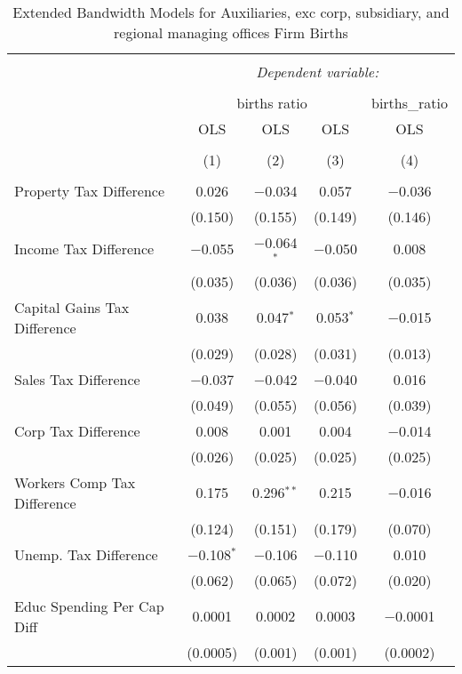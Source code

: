 
\begin{table}[!htbp] \centering 
  \caption{Extended Bandwidth Models for  Auxiliaries, exc corp, subsidiary, and regional managing offices Firm Births} 
  \label{95eb} 
\begin{tabular}{@{\extracolsep{5pt}}lcccc} 
\\[-1.8ex]\hline 
\hline \\[-1.8ex] 
 & \multicolumn{4}{c}{\textit{Dependent variable:}} \\ 
\cline{2-5} 
\\[-1.8ex] & \multicolumn{3}{c}{births ratio} & births\_ratio \\ 
 & OLS & OLS & OLS & OLS \\ 
\\[-1.8ex] & (1) & (2) & (3) & (4)\\ 
\hline \\[-1.8ex] 
 Property Tax Difference & 0.026 & $-$0.034 & 0.057 & $-$0.036 \\ 
  & (0.150) & (0.155) & (0.149) & (0.146) \\ 
  Income Tax Difference & $-$0.055 & $-$0.064$^{*}$ & $-$0.050 & 0.008 \\ 
  & (0.035) & (0.036) & (0.036) & (0.035) \\ 
  Capital Gains Tax Difference & 0.038 & 0.047$^{*}$ & 0.053$^{*}$ & $-$0.015 \\ 
  & (0.029) & (0.028) & (0.031) & (0.013) \\ 
  Sales Tax Difference & $-$0.037 & $-$0.042 & $-$0.040 & 0.016 \\ 
  & (0.049) & (0.055) & (0.056) & (0.039) \\ 
  Corp Tax Difference & 0.008 & 0.001 & 0.004 & $-$0.014 \\ 
  & (0.026) & (0.025) & (0.025) & (0.025) \\ 
  Workers Comp Tax Difference & 0.175 & 0.296$^{**}$ & 0.215 & $-$0.016 \\ 
  & (0.124) & (0.151) & (0.179) & (0.070) \\ 
  Unemp. Tax Difference & $-$0.108$^{*}$ & $-$0.106 & $-$0.110 & 0.010 \\ 
  & (0.062) & (0.065) & (0.072) & (0.020) \\ 
  Educ Spending Per Cap Diff & 0.0001 & 0.0002 & 0.0003 & $-$0.0001 \\ 
  & (0.0005) & (0.001) & (0.001) & (0.0002) \\ 

\end{tabular}
\end{table}
